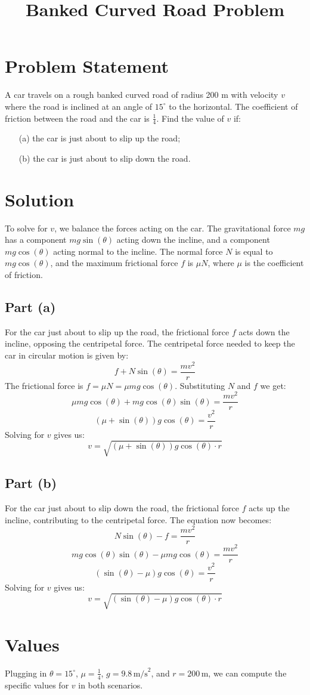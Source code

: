 \documentclass{article}
\begin{document}
\title{Banked Curved Road Problem}
\date{}
\maketitle

\section*{Problem Statement}
A car travels on a rough banked curved road of radius 200 m with velocity \( v \) where the road is inclined at an angle of \( 15^\circ \) to the horizontal. The coefficient of friction between the road and the car is \( \frac{1}{4} \). Find the value of \( v \) if:
\begin{enumerate}
    \item[(a)] the car is just about to slip up the road;
    \item[(b)] the car is just about to slip down the road.
\end{enumerate}

\section*{Solution}
To solve for \( v \), we balance the forces acting on the car. The gravitational force \( mg \) has a component \( mg\sin(\theta) \) acting down the incline, and a component \( mg\cos(\theta) \) acting normal to the incline. The normal force \( N \) is equal to \( mg\cos(\theta) \), and the maximum frictional force \( f \) is \( \mu N \), where \( \mu \) is the coefficient of friction.

\subsection*{Part (a)}
For the car just about to slip up the road, the frictional force \( f \) acts down the incline, opposing the centripetal force. The centripetal force needed to keep the car in circular motion is given by:
\[ f + N\sin(\theta) = \frac{mv^2}{r} \]
The frictional force is \( f = \mu N = \mu mg\cos(\theta) \). Substituting \( N \) and \( f \) we get:
\[ \mu mg\cos(\theta) + mg\cos(\theta)\sin(\theta) = \frac{mv^2}{r} \]
\[ \left( \mu + \sin(\theta) \right) g\cos(\theta) = \frac{v^2}{r} \]
Solving for \( v \) gives us:
\[ v = \sqrt{\left( \mu + \sin(\theta) \right) g\cos(\theta) \cdot r} \]

\subsection*{Part (b)}
For the car just about to slip down the road, the frictional force \( f \) acts up the incline, contributing to the centripetal force. The equation now becomes:
\[ N\sin(\theta) - f = \frac{mv^2}{r} \]
\[ mg\cos(\theta)\sin(\theta) - \mu mg\cos(\theta) = \frac{mv^2}{r} \]
\[ \left( \sin(\theta) - \mu \right) g\cos(\theta) = \frac{v^2}{r} \]
Solving for \( v \) gives us:
\[ v = \sqrt{\left( \sin(\theta) - \mu \right) g\cos(\theta) \cdot r} \]

\section*{Values}
Plugging in \( \theta = 15^\circ \), \( \mu = \frac{1}{4} \), \( g = 9.8 \, \text{m/s}^2 \), and \( r = 200 \, \text{m} \), we can compute the specific values for \( v \) in both scenarios.
\end{document}
